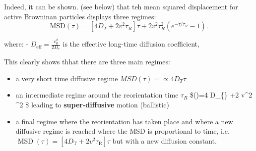\documentclass[
  letterpaper,
  enabledeprecatedfontcommands]{report}
\providecommand{\tightlist}{%
  \setlength{\itemsep}{0pt}\setlength{\parskip}{0pt}}
\begin{document}
Indeed, it can be shown. (see below) that teh mean squared displacement
for active Browninan particles displays three regimes: \[
\mathrm{MSD}(\tau) = \left[4 D_T + 2 v^2 \tau_R \right] \tau + 2 v^2 \tau_R^2 \left( e^{-\tau / \tau_R} - 1 \right).
\]

where: - \(D_{\mathrm{eff}} = \frac{v_0^2}{2 D_r}\) is the effective
long-time diffusion coefficient,

This clearly shows thhat there are three main regimes:

\begin{itemize}
\tightlist
\item
  a very short time diffusive regime \(MSD(\tau) = \propto 4D_T\tau\)
\item
  an intermediate regime around the reorientation time \(\tau_R\)
  \$(\tau)=4 D\_\{\} \tau+2 v\^{}2 \tau\^{}2
  \$ leading to \textbf{super-diffusive} motion (ballistic)
\item
  a final regime where the reorientation has taken place and where a new
  diffusive regime is reached where the MSD is proportional to time,
  i.e.~\(\operatorname{MSD}(\tau)=\left[4 D_{\mathrm{T}}+2 v^2 \tau_{\mathrm{R}}\right] \tau\)
  but with a new diffusion constant.
\end{itemize}
\end{document}
